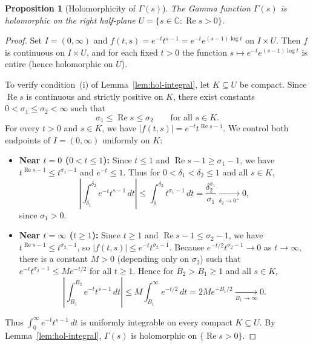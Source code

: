 \documentclass[11pt]{article}
\theoremstyle{plain}
\newtheorem{proposition}[theorem]{Proposition}
\theoremstyle{definition}
\theoremstyle{boldremark}
\theoremstyle{remark}
\numberwithin{equation}{section}
\newcommand{\C}{\mathbb{C}}
\DeclareMathOperator{\Real}{Re}
\begin{document}
\begin{proposition}[Holomorphicity of $\Gamma(s)$]\label{prop:gamma-hol}
The Gamma function $\Gamma(s)$ is holomorphic on the right half-plane
$U=\{s\in\C:\Real s > 0\}$.
\end{proposition}

\begin{proof}
Set $I=(0,\infty)$ and $f(t,s)=e^{-t}t^{s-1}=e^{-t}e^{(s-1)\log t}$ on
$I\times U$. Then $f$ is continuous on $I\times U$, and for each fixed
$t>0$ the function $s\mapsto e^{-t}e^{(s-1)\log t}$ is entire (hence
holomorphic on $U$).

To verify condition~(i) of Lemma~\ref{lem:hol-integral}, let $K\subseteq U$
be compact. Since $\Real s$ is continuous and strictly positive on $K$,
there exist constants $0<\sigma_1\leq\sigma_2<\infty$ such that
\[
 \sigma_1 \leq \Real s \leq \sigma_2 \qquad \text{for all } s\in K.
\]
For every $t>0$ and $s\in K$, we have $|f(t,s)|=e^{-t}t^{\Real s-1}$. We
control both endpoints of $I=(0,\infty)$ uniformly on $K$:
\begin{itemize}
 \item \textbf{Near $t=0$ ($0<t\leq 1$):} Since $t\leq 1$ and
       $\Real s-1\geq\sigma_1-1$, we have $t^{\Real s-1}\leq t^{\sigma_1-1}$
       and $e^{-t}\leq 1$. Thus for $0<\delta_1<\delta_2\leq 1$ and all
       $s\in K$,
       \[
        \left|\int_{\delta_1}^{\delta_2} e^{-t}t^{s-1}\,dt\right|
        \leq \int_0^{\delta_2} t^{\sigma_1-1}\,dt
        = \frac{\delta_2^{\sigma_1}}{\sigma_1}
        \xrightarrow[\delta_2\to 0^+]{} 0,
       \]
       since $\sigma_1>0$.
 \item \textbf{Near $t=\infty$ ($t\geq 1$):} Since $t\geq 1$ and
       $\Real s-1\leq\sigma_2-1$, we have $t^{\Real s-1}\leq t^{\sigma_2-1}$,
       so $|f(t,s)|\leq e^{-t}t^{\sigma_2-1}$. Because
       $e^{-t/2}t^{\sigma_2-1}\to 0$ as $t\to\infty$, there is a constant
       $M>0$ (depending only on $\sigma_2$) such that
       $e^{-t}t^{\sigma_2-1}\leq M e^{-t/2}$ for all $t\geq 1$. Hence for
       $B_2>B_1\geq 1$ and all $s\in K$,
       \[
        \left|\int_{B_1}^{B_2} e^{-t}t^{s-1}\,dt\right|
        \leq M\int_{B_1}^{\infty} e^{-t/2}\,dt
        = 2M e^{-B_1/2}
        \xrightarrow[B_1\to\infty]{} 0.
       \]
\end{itemize}
Thus $\int_0^{\infty} e^{-t}t^{s-1}\,dt$ is uniformly integrable on every
compact $K\subseteq U$. By Lemma~\ref{lem:hol-integral}, $\Gamma(s)$ is
holomorphic on $\{\Real s > 0\}$.
\end{proof}
\end{document}
